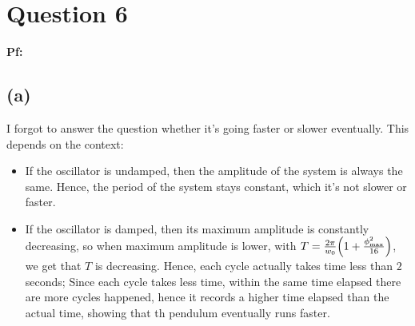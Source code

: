\documentclass{article}
\DeclarePairedDelimiter{\paran}{(}{)}%
\begin{document}
\break

\section*{Question 6}

\textbf{Pf:}
\subsection*{(a)}
I forgot to answer the question whether it's going faster or slower eventually. This depends on the context:
\begin{itemize}
    \item If the oscillator is undamped, then the amplitude of the system is always the same. Hence, the period of the system stays constant, which it's not slower or faster.
    \item If the oscillator is damped, then its maximum amplitude is constantly decreasing, so when maximum amplitude is lower, with $T=\frac{2\pi}{w_0}\paran*{1+\frac{\phi_{\max}^2}{16}}$, we get that $T$ is decreasing. Hence, each cycle actually takes time less than $2$ seconds; Since each cycle takes less time, within the same time elapsed there are more cycles happened, hence it records a higher time elapsed than the actual time, showing that th pendulum eventually runs faster.
\end{itemize}
\end{document}
